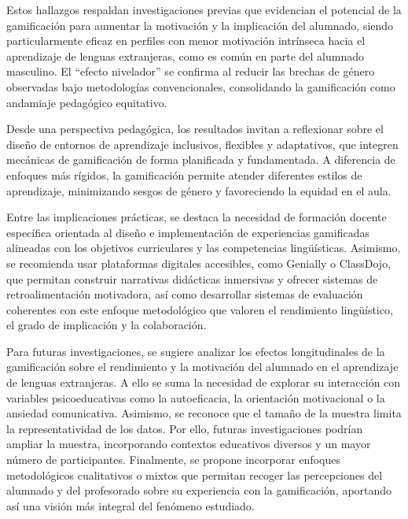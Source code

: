 \documentclass[spanish]{textolivre}
\begin{document}
Estos hallazgos respaldan investigaciones previas que evidencian el potencial de la gamificación para aumentar la motivación y la implicación del alumnado, siendo particularmente eficaz en perfiles con menor motivación intrínseca hacia el aprendizaje de lenguas extranjeras, como es común en parte del alumnado masculino. El ``efecto nivelador'' se confirma al reducir las brechas de género observadas bajo metodologías convencionales, consolidando la gamificación como andamiaje pedagógico equitativo.

Desde una perspectiva pedagógica, los resultados invitan a reflexionar sobre el diseño de entornos de aprendizaje inclusivos, flexibles y adaptativos, que integren mecánicas de gamificación de forma planificada y fundamentada. A diferencia de enfoques más rígidos, la gamificación permite atender diferentes estilos de aprendizaje, minimizando sesgos de género y favoreciendo la equidad en el aula.

Entre las implicaciones prácticas, se destaca la necesidad de formación docente específica orientada al diseño e implementación de experiencias gamificadas alineadas con los objetivos curriculares y las competencias lingüísticas. Asimismo, se recomienda usar plataformas digitales accesibles, como Genially o ClassDojo, que permitan construir narrativas didácticas inmersivas y ofrecer sistemas de retroalimentación motivadora, así como desarrollar sistemas de evaluación coherentes con este enfoque metodológico que valoren el rendimiento lingüístico, el grado de implicación y la colaboración.

Para futuras investigaciones, se sugiere analizar los efectos longitudinales de la gamificación sobre el rendimiento y la motivación del alumnado en el aprendizaje de lenguas extranjeras. A ello se suma la necesidad de explorar su interacción con variables psicoeducativas como la autoeficacia, la orientación motivacional o la ansiedad comunicativa. Asimismo, se reconoce que el tamaño de la muestra limita la representatividad de los datos. Por ello, futuras investigaciones podrían ampliar la muestra, incorporando contextos educativos diversos y un mayor número de participantes. Finalmente, se propone incorporar enfoques metodológicos cualitativos o mixtos que permitan recoger las percepciones del alumnado y del profesorado sobre su experiencia con la gamificación, aportando así una visión más integral del fenómeno estudiado.
\end{document}
